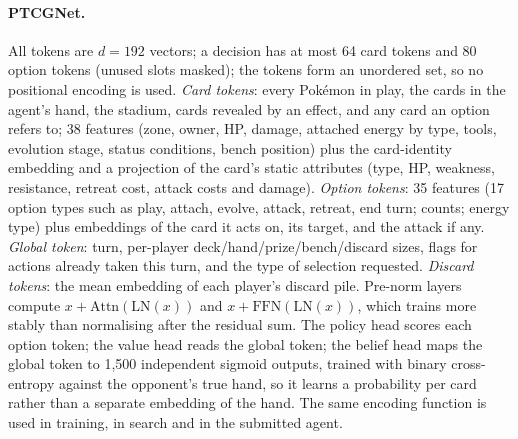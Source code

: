 \documentclass{article}
\begin{document}
\paragraph*{PTCGNet.} All tokens are $d{=}192$ vectors; a decision has at most 64 card tokens and 80 option tokens (unused slots masked); the tokens form an unordered set, so no positional encoding is used. \emph{Card tokens}: every Pok\'emon in play, the cards in the agent's hand, the stadium, cards revealed by an effect, and any card an option refers to; 38 features (zone, owner, HP, damage, attached energy by type, tools, evolution stage, status conditions, bench position) plus the card-identity embedding and a projection of the card's static attributes (type, HP, weakness, resistance, retreat cost, attack costs and damage). \emph{Option tokens}: 35 features (17 option types such as play, attach, evolve, attack, retreat, end turn; counts; energy type) plus embeddings of the card it acts on, its target, and the attack if any. \emph{Global token}: turn, per-player deck/hand/prize/bench/discard sizes, flags for actions already taken this turn, and the type of selection requested. \emph{Discard tokens}: the mean embedding of each player's discard pile. Pre-norm layers compute $x+\mathrm{Attn}(\mathrm{LN}(x))$ and $x+\mathrm{FFN}(\mathrm{LN}(x))$, which trains more stably than normalising after the residual sum. The policy head scores each option token; the value head reads the global token; the belief head maps the global token to 1{,}500 independent sigmoid outputs, trained with binary cross-entropy against the opponent's true hand, so it learns a probability per card rather than a separate embedding of the hand. The same encoding function is used in training, in search and in the submitted agent.
\end{document}
